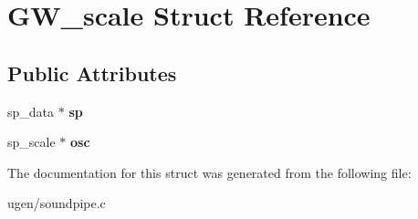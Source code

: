 \hypertarget{structGW__scale}{}\section{G\+W\+\_\+scale Struct Reference}
\label{structGW__scale}
\subsection*{Public Attributes}
\begin{DoxyCompactItemize}
\item 
\hypertarget{structGW__scale_a506f6cfcfa019dcb86d6d2f6bed80d1d}{}\label{structGW__scale_a506f6cfcfa019dcb86d6d2f6bed80d1d} 
sp\+\_\+data $\ast$ {\bfseries sp}
\item 
\hypertarget{structGW__scale_aab5cc0e1adc00a3a4234788ede338613}{}\label{structGW__scale_aab5cc0e1adc00a3a4234788ede338613} 
sp\+\_\+scale $\ast$ {\bfseries osc}
\end{DoxyCompactItemize}


The documentation for this struct was generated from the following file\+:\begin{DoxyCompactItemize}
\item 
ugen/soundpipe.\+c\end{DoxyCompactItemize}
